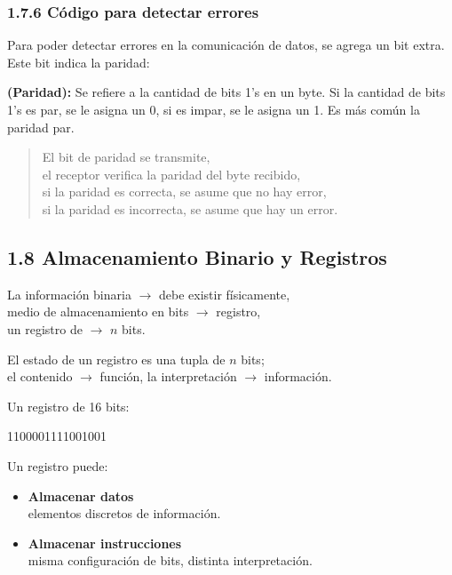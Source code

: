 \subsubsection*{1.7.6 C\'{o}digo para detectar errores}
Para poder detectar errores en la comunicaci\'{o}n de datos, se agrega un bit
extra. Este bit indica la paridad:

\textbf{(Paridad):} Se refiere a la cantidad de bits 1's en un byte. Si la
cantidad de bits 1's es par, se le asigna un 0, si es impar, se le asigna un 1.
Es m\'{a}s com\'{u}n la paridad par.

\begin{verse}
    El bit de paridad se transmite, \\
    el receptor verifica la paridad del byte recibido, \\
    si la paridad es correcta, se asume que no hay error, \\
    si la paridad es incorrecta, se asume que hay un error.
\end{verse}

\subsection*{1.8 Almacenamiento Binario y Registros}
La informaci\'{o}n binaria $\rightarrow$ debe existir f\'{i}sicamente, \\
medio de almacenamiento en bits $\rightarrow$ registro, \\
un registro de $\rightarrow$ $n$ bits.
\medbreak

El estado de un registro es una tupla de $n$ bits; \\
el contenido $\rightarrow$ funci\'{o}n, la interpretaci\'{o}n $\rightarrow$ informaci\'{o}n.
\medbreak

Un registro de 16 bits:
\begin{center}
    1100001111001001
\end{center}

Un registro puede:
\begin{itemize}
    \item
          \begin{center}
              \textbf{Almacenar datos} \\
              elementos discretos de informaci\'{o}n.
          \end{center}
    \item
          \begin{center}
              \textbf{Almacenar instrucciones} \\
              misma configuraci\'{o}n de bits, distinta interpretaci\'{o}n.
          \end{center}
\end{itemize}
\medbreak

